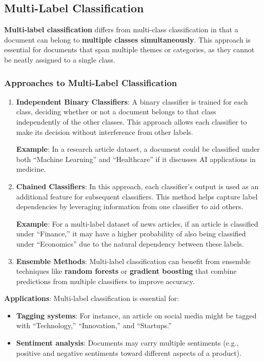 \documentclass{article}
\begin{document}
\subsection{Multi-Label Classification}

\textbf{Multi-label classification} differs from multi-class classification in that a document can belong to \textbf{multiple classes simultaneously}. This approach is essential for documents that span multiple themes or categories, as they cannot be neatly assigned to a single class.

\subsubsection*{Approaches to Multi-Label Classification}
\begin{enumerate}
    \item \textbf{Independent Binary Classifiers}: A binary classifier is trained for each class, deciding whether or not a document belongs to that class independently of the other classes. This approach allows each classifier to make its decision without interference from other labels.
    
    \textbf{Example}: In a research article dataset, a document could be classified under both “Machine Learning” and “Healthcare” if it discusses AI applications in medicine.

    \item \textbf{Chained Classifiers}: In this approach, each classifier’s output is used as an additional feature for subsequent classifiers. This method helps capture label dependencies by leveraging information from one classifier to aid others.
    
    \textbf{Example}: For a multi-label dataset of news articles, if an article is classified under “Finance,” it may have a higher probability of also being classified under “Economics” due to the natural dependency between these labels.

    \item \textbf{Ensemble Methods}: Multi-label classification can benefit from ensemble techniques like \textbf{random forests} or \textbf{gradient boosting} that combine predictions from multiple classifiers to improve accuracy.
\end{enumerate}

\textbf{Applications}:
Multi-label classification is essential for:
\begin{itemize}
    \item \textbf{Tagging systems}: For instance, an article on social media might be tagged with “Technology,” “Innovation,” and “Startups.”
    \item \textbf{Sentiment analysis}: Documents may carry multiple sentiments (e.g., positive and negative sentiments toward different aspects of a product).
\end{itemize}
\end{document}
